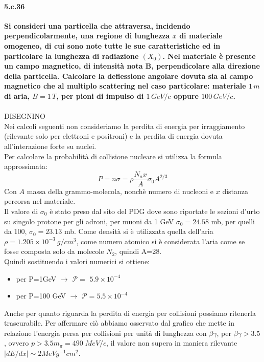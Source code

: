 \documentclass[twoside]{article}
\begin{document}
\paragraph{5.c.36}\textbf{Si consideri una particella che attraversa, incidendo perpendicolarmente, una regione di lunghezza $x$ di materiale omogeneo, di cui sono note tutte le sue caratteristiche ed in particolare la lunghezza di radiazione $(X_0)$. Nel materiale è presente un campo magnetico, di intensità nota B, perpendicolare alla direzione della particella. Calcolare la deflessione angolare dovuta sia al campo magnetico che al multiplo scattering nel caso particolare: materiale $1\, m$ di aria, $B=1\, T$, per pioni di impulso di $1\, GeV/c$ oppure $100\, GeV/c$.}
\\ \\
DISEGNINO\\
Nei calcoli seguenti non consideriamo la perdita di energia per irraggiamento (rilevante solo per elettroni e positroni) e la perdita di energia dovuta all'interazione forte su nuclei. \\
Per calcolare la probabilità di collisione nucleare si utilizza la formula approssimata:
\begin{equation}
 P=n\sigma=\rho \frac{N_a x}{A}\sigma_0 A^{2/3} 
\end{equation}
Con $A$ massa della grammo-molecola, nonchè numero di nucleoni e $x$ distanza percorsa nel materiale.
\\
Il valore di $\sigma_0$ è stato preso dal sito del PDG dove sono riportate le sezioni d'urto su singolo protone per gli adroni, per muoni da 1 GeV $\sigma_0= 24.58$ mb, per quelli da 100, $\sigma_0=23.13$ mb. Come densità si è utilizzata quella dell'aria $\rho=1.205 \times 10^{-3}\ g/cm^3$,  come numero atomico si è considerata l'aria come se fosse composta solo da molecole $N_2$, quindi A=28. \\
Quindi sostituendo i valori numerici si ottiene:
\begin{itemize}
    \item per P=1GeV $\rightarrow$ $\mathcal{P}= $ $5.9 \times 10^{-4}$
    \item per P=100 GeV $\rightarrow$ $\mathcal{P}= 5.5 \times 10^{-4} $
\end{itemize}
Anche per quanto riguarda la perdita di energia per collisioni possiamo ritenerla trascurabile. Per affermare ciò abbiamo osservato dal grafico che mette in relazione l'energia persa per collisioni per unità di lunghezza con $\beta \gamma$, per $\beta \gamma> 3.5$, ovvero $p>3.5 m_{\pi}= 490 \; MeV/c$, il valore non supera in maniera rilevante $|dE/dx|\sim 2 MeV g^{-1} cm^2$.
\end{document}
